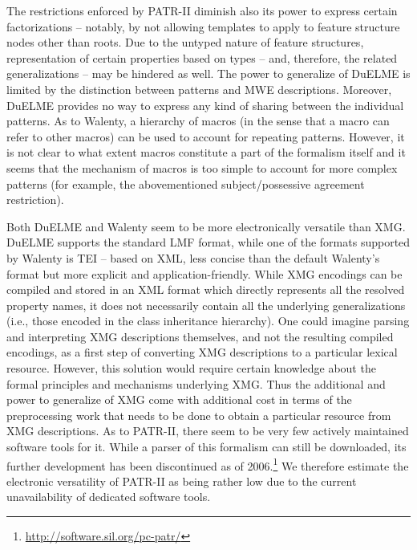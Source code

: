 \documentclass[output=paper]{langsci/langscibook}
\begin{document}
The restrictions enforced by PATR-II diminish also its power to express certain factorizations -- notably, by not allowing templates to apply to feature structure nodes other than roots. Due to the untyped nature of feature structures, representation of certain properties based on types -- and, therefore, the related generalizations -- may be hindered as well. The power to generalize of DuELME is limited by the distinction between patterns and MWE descriptions. Moreover, DuELME provides no way to express any kind of sharing between the individual patterns. As to Walenty, a hierarchy of macros (in the sense that a macro can refer to other macros) can be used to account for repeating patterns. However, it is not clear to what extent macros constitute a part of the formalism itself and it seems that the mechanism of macros is too simple to account for more complex patterns (for example, the abovementioned subject/possessive agreement restriction).
 
Both DuELME and Walenty seem to be more electronically versatile than XMG. DuELME supports the standard LMF format, while one of the formats supported by Walenty is TEI -- based on XML, less concise than the default Walenty's format but more explicit and application-friendly. While XMG encodings can be compiled and stored in an XML format which directly represents all the resolved property names, it does not necessarily contain all the underlying generalizations (i.e., those encoded in the class inheritance hierarchy). One could imagine parsing and interpreting XMG descriptions themselves, and not the resulting compiled encodings, as a first step of converting XMG descriptions to a particular lexical resource. However, this solution would require certain knowledge about the formal principles and mechanisms underlying XMG. Thus the additional  and power to generalize of XMG come with additional cost in terms of the preprocessing work that needs to be done to obtain a particular resource from XMG descriptions. As to PATR-II, there seem to be very few actively maintained software tools for it. While a parser of this formalism can still be downloaded, its further development has been discontinued as of 2006.\footnote{\url{http://software.sil.org/pc-patr/}} We therefore estimate the electronic versatility of PATR-II as being rather low due to the current unavailability of dedicated software tools. 
\end{document}
